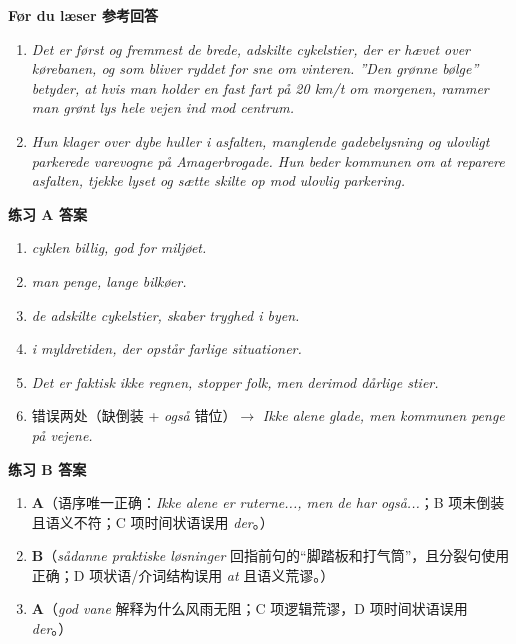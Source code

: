 \begin{answerbox}
\textbf{Før du læser 参考回答}
\begin{enumerate}
  \item \textit{Det er først og fremmest de brede, adskilte cykelstier, der er hævet over kørebanen, og som bliver ryddet for sne om vinteren. ”Den grønne bølge” betyder, at hvis man holder en fast fart på 20 km/t om morgenen, rammer man grønt lys hele vejen ind mod centrum.}
  \item \textit{Hun klager over dybe huller i asfalten, manglende gadebelysning og ulovligt parkerede varevogne på Amagerbrogade. Hun beder kommunen om at reparere asfalten, tjekke lyset og sætte skilte op mod ulovlig parkering.}
\end{enumerate}

\textbf{练习 A 答案}
\begin{enumerate}
  \item \textit{ cyklen billig,  god for miljøet.}
  \item \textit{ man penge,  lange bilkøer.}
  \item \textit{ de adskilte cykelstier,  skaber tryghed i byen.}
  \item \textit{ i myldretiden,  der opstår farlige situationer.}
  \item \textit{Det er faktisk ikke regnen,  stopper folk, men derimod dårlige stier.}
  \item 错误两处（缺倒装 + \textit{også} 错位）$\rightarrow$ \textit{Ikke alene  glade, men kommunen  penge på vejene.}
\end{enumerate}

\textbf{练习 B 答案}
\begin{enumerate}
  \item \textbf{A}（语序唯一正确：\textit{Ikke alene er ruterne..., men de har også...}；B 项未倒装且语义不符；C 项时间状语误用 \textit{der}。）
  \item \textbf{B}（\textit{sådanne praktiske løsninger} 回指前句的“脚踏板和打气筒”，且分裂句使用正确；D 项状语/介词结构误用 \textit{at} 且语义荒谬。）
  \item \textbf{A}（\textit{god vane} 解释为什么风雨无阻；C 项逻辑荒谬，D 项时间状语误用 \textit{der}。）
\end{enumerate}


\end{answerbox}
